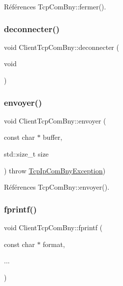 Références Tcp\+Com\+Bny\+::fermer().

\mbox{\label{classClientTcpComBny_aec1398f686da1f83884fd98924cc0725}} 
\subsubsection{\texorpdfstring{deconnecter()}{deconnecter()}}
{\footnotesize\ttfamily void Client\+Tcp\+Com\+Bny\+::deconnecter (\begin{DoxyParamCaption}\item[{void}]{ }\end{DoxyParamCaption})}

\mbox{\label{classClientTcpComBny_acf5ac7ad2c6815e6797a95f50906172f}} 
\subsubsection{\texorpdfstring{envoyer()}{envoyer()}}
{\footnotesize\ttfamily void Client\+Tcp\+Com\+Bny\+::envoyer (\begin{DoxyParamCaption}\item[{const char $\ast$}]{buffer,  }\item[{std\+::size\+\_\+t}]{size }\end{DoxyParamCaption}) throw  \hyperlink{classTcpIpComBnyException}{Tcp\+Ip\+Com\+Bny\+Exception}) }



Références Tcp\+Com\+Bny\+::envoyer().

\mbox{\label{classClientTcpComBny_a3f2db7ecde5bf993a96bae8f4107e1c8}} 
\subsubsection{\texorpdfstring{fprintf()}{fprintf()}}
{\footnotesize\ttfamily void Client\+Tcp\+Com\+Bny\+::fprintf (\begin{DoxyParamCaption}\item[{const char $\ast$}]{format,  }\item[{}]{... }\end{DoxyParamCaption})}



